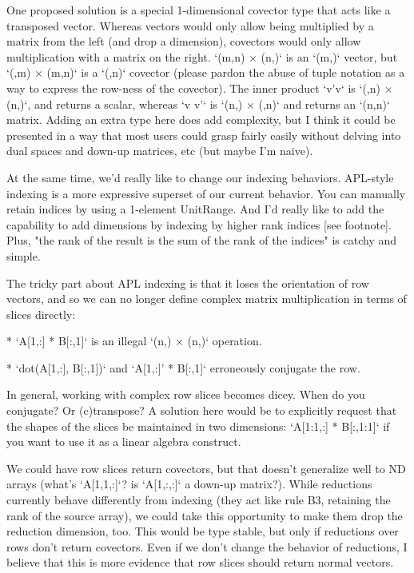 One proposed solution is a special 1-dimensional covector type that acts like a
transposed vector. Whereas vectors would only allow being multiplied by a
matrix from the left (and drop a dimension), covectors would only allow
multiplication with a matrix on the right. `(m,n) × (n,)` is an `(m,)` vector,
but `(,m) × (m,n)` is a `(,n)` covector (please pardon the abuse of tuple
notation as a way to express the row-ness of the covector). The inner product
`v'v` is `(,n) × (n,)`, and returns a scalar, whereas `v v'` is `(n,) × (,n)`
and returns an `(n,n)` matrix. Adding an extra type here does add complexity,
but I think it could be presented in a way that most users could grasp fairly
easily without delving into dual spaces and down-up matrices, etc (but maybe
I'm naive).

At the same time, we'd really like to change our indexing behaviors. APL-style
indexing is a more expressive superset of our current behavior. You can
manually retain indices by using a 1-element UnitRange. And I'd really like to
add the capability to add dimensions by indexing by higher rank indices [see footnote]. Plus,
"the rank of the result is the sum of the rank of the indices" is catchy and
simple.

The tricky part about APL indexing is that it loses the orientation of row
vectors, and so we can no longer define complex matrix multiplication in terms
of slices directly:

* `A[1,:] * B[:,1]` is an illegal `(n,) × (n,)` operation.

* `dot(A[1,:], B[:,1])` and `A[1,:]' * B[:,1]` erroneously conjugate the row.

In general, working with complex row slices becomes dicey. When do you
conjugate? Or (c)transpose? A solution here would be to explicitly request that
the shapes of the slices be maintained in two dimensions: `A[1:1,:] * B[:,1:1]`
if you want to use it as a linear algebra construct.

We could have row slices return covectors, but that doesn't generalize well to
ND arrays (what's `A[1,1,:]`? is `A[1,:,:]` a down-up matrix?). While
reductions currently behave differently from indexing (they act like rule B3,
retaining the rank of the source array), we could take this opportunity to make
them drop the reduction dimension, too. This would be type stable, but only if
reductions over rows don't return covectors. Even if we don't change the
behavior of reductions, I believe that this is more evidence that row slices
should return normal vectors.

